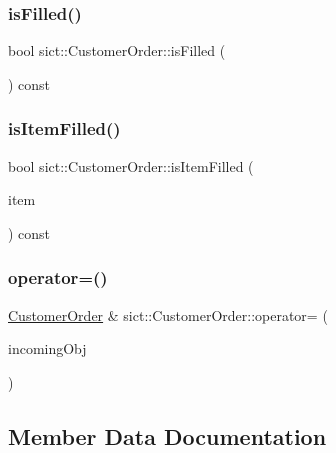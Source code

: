 \subsubsection{\texorpdfstring{isFilled()}{isFilled()}}
{\footnotesize\ttfamily bool sict\+::\+Customer\+Order\+::is\+Filled (\begin{DoxyParamCaption}{ }\end{DoxyParamCaption}) const}

\mbox{\label{classsict_1_1CustomerOrder_a1f8f4fab0abe3139267fe75b1265f99d}} 
\subsubsection{\texorpdfstring{isItemFilled()}{isItemFilled()}}
{\footnotesize\ttfamily bool sict\+::\+Customer\+Order\+::is\+Item\+Filled (\begin{DoxyParamCaption}\item[{const std\+::string \&}]{item }\end{DoxyParamCaption}) const}

\mbox{\label{classsict_1_1CustomerOrder_a1502e66899c28b565610e8516985a27b}} 
\subsubsection{\texorpdfstring{operator=()}{operator=()}}
{\footnotesize\ttfamily \mbox{\hyperlink{classsict_1_1CustomerOrder}{Customer\+Order}} \& sict\+::\+Customer\+Order\+::operator= (\begin{DoxyParamCaption}\item[{\mbox{\hyperlink{classsict_1_1CustomerOrder}{Customer\+Order}} \&\&}]{incoming\+Obj }\end{DoxyParamCaption})}



\subsection{Member Data Documentation}
\mbox{\label{classsict_1_1CustomerOrder_a996887895e1f451af8ed6bb98e264d3a}} 
